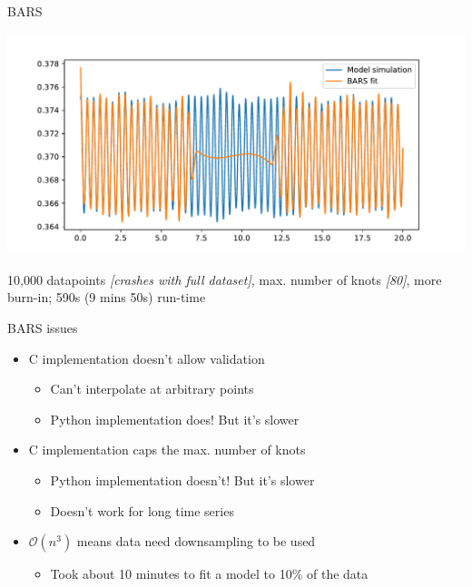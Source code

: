 \documentclass[presentation]{beamer}
\begin{document}
\begin{frame}[label={sec:org240d512}]{BARS}
\begin{center}
\includegraphics[width=.9\linewidth]{./barsfull2.pdf}
\end{center}

10,000 datapoints \emph{[crashes with full dataset]}, max. number of knots \emph{[80]}, more burn-in;  590s (9 mins 50s) run-time
\end{frame}

\begin{frame}[label={sec:org50e32b7}]{BARS issues}
\begin{itemize}
\item C implementation doesn't allow validation
\begin{itemize}
\item Can't interpolate at arbitrary points
\item Python implementation does! But it's slower
\end{itemize}
\item C implementation caps the max. number of knots
\begin{itemize}
\item Python implementation doesn't! But it's slower
\item Doesn't work for long time series
\end{itemize}
\item \(\mathcal{O}(n^3)\) means data need downsampling to be used
\begin{itemize}
\item Took about 10 minutes to fit a model to 10\% of the data
\end{itemize}
\end{itemize}
\end{frame}
\end{document}
